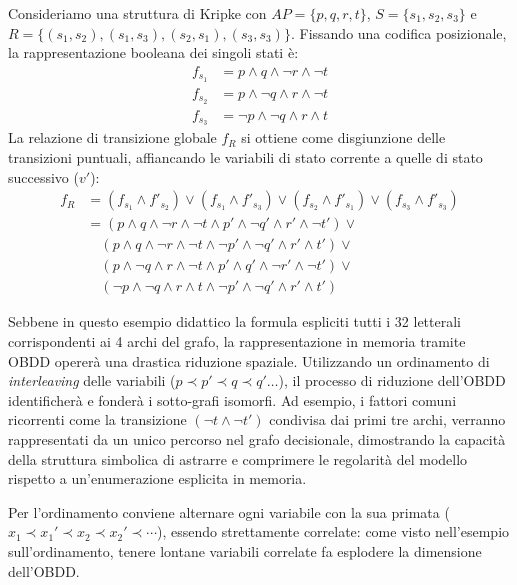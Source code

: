 \begin{example}{}
  Consideriamo una struttura di Kripke con \(AP= \{p,q,r,t\}\), \(S = \{s_1, s_2, s_3\}\) e \(R = \{(s_1,s_2), (s_1,s_3), (s_2,s_1), (s_3,s_3)\}\). Fissando una codifica posizionale, la rappresentazione booleana dei singoli stati è:
  \begin{align*}
    f_{s_1} & = p \land q \land \neg r \land \neg t \\
    f_{s_2} & = p \land \neg q \land r \land \neg t \\
    f_{s_3} & = \neg p \land \neg q \land r \land t
  \end{align*}
  La relazione di transizione globale \(f_R\) si ottiene come disgiunzione delle transizioni puntuali, affiancando le variabili di stato corrente a quelle di stato successivo (\(v'\)):
  \begin{align*}
    f_R & = (f_{s_1} \land f'_{s_2}) \lor (f_{s_1} \land f'_{s_3}) \lor (f_{s_2} \land f'_{s_1}) \lor (f_{s_3} \land f'_{s_3}) \\
        & = (p \land q \land \neg r \land \neg t \land p' \land \neg q' \land r' \land \neg t') \lor\\
        & \quad (p \land q \land \neg r \land \neg t \land \neg p' \land \neg q' \land r' \land t') \lor \\
        & \quad (p \land \neg q \land r \land \neg t \land p' \land q' \land \neg r' \land \neg t') \lor \\
        & \quad (\neg p \land \neg q \land r \land t \land \neg p' \land \neg q' \land r' \land t')
  \end{align*}

  Sebbene in questo esempio didattico la formula espliciti tutti i 32 letterali corrispondenti ai 4 archi del grafo, la rappresentazione in memoria tramite OBDD opererà una drastica riduzione spaziale. Utilizzando un ordinamento di \emph{interleaving} delle variabili (\(p \prec p' \prec q \prec q' \dots\)), il processo di riduzione dell'OBDD identificherà e fonderà i sotto-grafi isomorfi. Ad esempio, i fattori comuni ricorrenti come la transizione \((\neg t \land \neg t')\) condivisa dai primi tre archi, verranno rappresentati da un unico percorso nel grafo decisionale, dimostrando la capacità della struttura simbolica di astrarre e comprimere le regolarità del modello rispetto a un'enumerazione esplicita in memoria.

\end{example}

\begin{note}{}
  Per l'ordinamento conviene alternare ogni variabile con la sua primata (\(x_1 \prec x_1' \prec x_2 \prec x_2' \prec \cdots\)), essendo strettamente correlate: come visto nell'esempio sull'ordinamento, tenere lontane variabili correlate fa esplodere la dimensione dell'OBDD\@.
\end{note}

